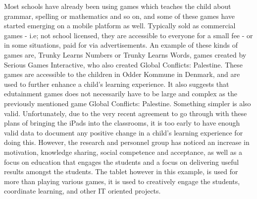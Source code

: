 Most schools have already been using games which teaches the child about grammar, spelling or mathematics and so on, and some of these games have started emerging on a mobile platform as well.
Typically sold as commercial games - i.e; not school licensed, they are accessible to everyone for a small fee - or in some situations, paid for via advertisements.
An example of these kinds of games are, Trunky Learns Numbers or Trunky Learns Words, games created by Serious Games Interactive, who also created Global Conflicts: Palestine.
These games are accessible to the children in Odder Kommune in Denmark, and are used to further enhance a child's learning experience.\cite{odderipad}
It also suggests that edutainment games does not necessarily have to be large and complex as the previously mentioned game Global Conflicts: Palestine.
Something simpler is also valid.
Unfortunately, due to the very recent agreement to go through with these plans of bringing the iPads into the classrooms, it is too early to have enough valid data to document any positive change in a child's learning experience for doing this.
However, the research and personnel group has noticed an increase in motivation, knowledge sharing, social competence and acceptance, as well as a focus on education that engages the students and a focus on delivering useful results amongst the students.\cite{odderipadpjece}
The tablet however in this example, is used for more than playing various games, it is used to creatively engage the students, coordinate learning, and other IT oriented projects.\cite{odderipadpjece}